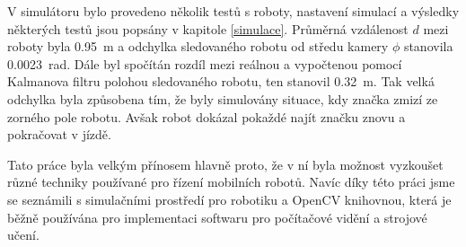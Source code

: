 \documentclass[twoside]{ctuthesis}
\theoremstyle{plain}
\theoremstyle{definition}
\theoremstyle{note}
\begin{document}
V simulátoru bylo provedeno několik testů s roboty, nastavení simulací a výsledky některých testů jsou popsány v kapitole \ref{simulace}. Průměrná vzdálenost $d$ mezi roboty byla \SI{0.95}{\meter} a odchylka sledovaného robotu od středu kamery $\phi$ stanovila \SI{0.0023}{\radian}. Dále byl spočítán rozdíl mezi reálnou a vypočtenou pomocí Kalmanova filtru polohou sledovaného robotu, ten stanovil \SI{0.32}{\meter}. Tak velká odchylka byla způsobena tím, že byly simulovány situace, kdy značka zmizí ze zorného pole robotu. Avšak robot dokázal pokaždé najít značku znovu a pokračovat v jízdě. 	


Tato práce byla velkým přínosem hlavně proto, že v ní byla možnost vyzkoušet různé techniky používané pro řízení mobilních robotů. Navíc díky této práci jsme se seznámili s simulačními prostředí pro robotiku a OpenCV knihovnou, která je běžně používána pro implementaci softwaru pro počítačové vidění a strojové učení.


\appendix
\end{document}
